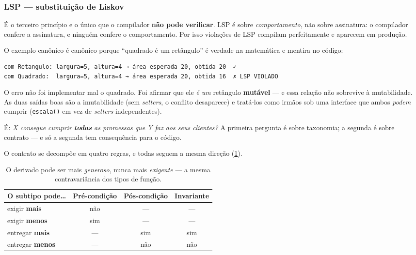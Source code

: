\subsubsection{LSP --- substituição de Liskov}

É o terceiro princípio e o único que o compilador \textbf{não pode verificar}.
LSP é sobre \emph{comportamento}, não sobre assinatura: o compilador confere a
assinatura, e ninguém confere o comportamento. Por isso violações de LSP
compilam perfeitamente e aparecem em produção.

O exemplo canônico é canônico porque ``quadrado é um retângulo'' é verdade na
matemática e mentira no código:

\begin{lstlisting}[style=bt, language=bash,
    caption={Saída de \texttt{src/solid/lsp/}: a mesma sequência de chamadas,
             resultados diferentes.}]
com Retangulo: largura=5, altura=4 → área esperada 20, obtida 20  ✓
com Quadrado:  largura=5, altura=4 → área esperada 20, obtida 16  ✗ LSP VIOLADO
\end{lstlisting}

O erro não foi implementar mal o quadrado. Foi afirmar que ele \emph{é um}
retângulo \textbf{mutável} --- e essa relação não sobrevive à mutabilidade. As
duas saídas boas são a imutabilidade (sem \emph{setters}, o conflito desaparece)
e tratá-los como irmãos sob uma interface que ambos \emph{podem} cumprir
(\texttt{escala()} em vez de \emph{setters} independentes).

\begin{regra}
É: \emph{X consegue cumprir \textbf{todas} as promessas que Y faz aos seus
clientes?} A primeira pergunta é sobre taxonomia; a segunda é sobre contrato ---
e só a segunda tem consequência para o código.
\end{regra}

O contrato se decompõe em quatro regras, e todas seguem a mesma direção
(\cref{tab:lsp-regras}).

\begin{table}[htbp]
\centering
\caption{O derivado pode ser mais \emph{generoso}, nunca mais \emph{exigente} ---
         a mesma contravariância dos tipos de função.}
\label{tab:lsp-regras}
\footnotesize
\begin{tabular}{@{}lccc@{}}
\toprule
\textbf{O subtipo pode\ldots} & \textbf{Pré-condição} & \textbf{Pós-condição} & \textbf{Invariante} \\
\midrule
exigir \textbf{mais}    & não & --- & --- \\
exigir \textbf{menos}   & sim & --- & --- \\
entregar \textbf{mais}  & --- & sim & sim \\
entregar \textbf{menos} & --- & não & não \\
\bottomrule
\end{tabular}
\end{table}

